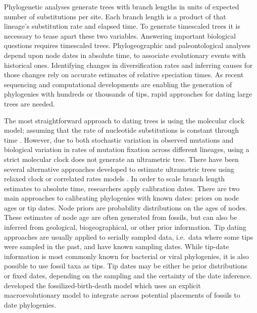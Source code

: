\documentclass{llncs}
\begin{document}
\vspace{1.5in}

Phylogenetic analyses generate trees with branch lengths in units of expected number of substitutions per site.
Each branch length is a product of that lineage's substitution rate and elapsed time.
To generate time\textendash scaled trees it is necessary to tease apart these two variables.
Answering important biological questions requires time\textendash scaled trees.
Phylogeographic and paleontological analyses depend upon node dates in absolute time,
to associate evolutionary events with historical ones.
Identifying changes in diversification rates and inferring causes for those changes
rely on accurate estimates of relative speciation times.
As recent sequencing and computational developments are enabling the generation of
phylogenies with hundreds or thousands of tips, rapid approaches for dating large trees are needed.

The most straightforward approach to dating trees is using the molecular clock model;
assuming that the rate of nucleotide substitutions is constant through time \citep{zuckerkandl1962}.
However, due to both stochastic variation in observed mutations and 
biological variation in rates of mutation fixation across different lineages,
using a strict molecular clock does not generate an ultrametric tree.
There have been several alternative approaches developed to estimate
ultrametric trees using relaxed clock or correlated rates models \citep{Lepage2007, Thorne1998, Kishino2001}.
In order to scale branch length estimates to absolute time, researchers apply calibration dates. 
There are two main approaches to calibrating phylogenies with known dates:
priors on node ages or tip dates.
Node priors are probability distributions on the ages of nodes.
These estimates of node age are often generated from fossils,
but can also be inferred from geological, biogeographical, or other prior information.
Tip dating approaches are usually applied to serially sampled data, 
i.e.\ data where some tips were sampled in the past, and have known sampling dates.
While tip-date information is most commonly known for bacterial or viral phylogenies,
it is also possible to use fossil taxa as tips.
Tip dates may be either be prior distributions or fixed dates, 
depending on the sampling and the certainty of the date inference.
\citet{Heath2014} developed the fossilized-birth-death model which 
uses an explicit macroevolutionary model to integrate across potential 
placements of fossils to date phylogenies.
\end{document}

